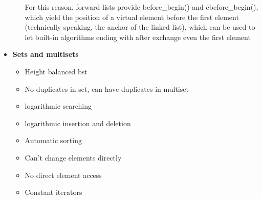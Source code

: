 \documentclass{report}
\begin{document}
\begin{itemize}
\begin{itemize}
                    \bigbreak \noindent 
                    For this reason, forward lists provide before\_begin() and cbefore\_begin(), which yield the position of a virtual element before the first element (technically speaking, the anchor of the linked list), which can be used to let built-in algorithms ending with after exchange even the first element
            \end{itemize}
        \item \textbf{Sets and multisets}
            \begin{itemize}
                \item Height balanced bst
                \item No duplicates in set, can have duplicates in multiset
                \item logarithmic searching
                \item logarithmic insertion and deletion
                \item Automatic sorting
                \item Can't change elements directly
                \item No direct element access
                \item Constant iterators
            \end{itemize}
   \end{itemize}
   

   \pagebreak 
\end{document}
